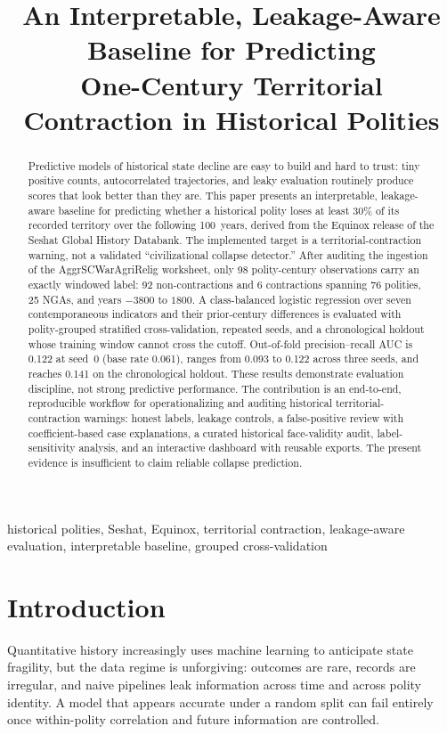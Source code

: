 \documentclass[conference]{IEEEtran}
\title{An Interpretable, Leakage-Aware Baseline for Predicting\\
One-Century Territorial Contraction in Historical Polities}
\author{
\IEEEauthorblockN{Shailesh Mishra (PES2UG24CS453), Shalik S (PES2UG24CS454),\\
Spoorthi A N (PES2UG24CS515), Aaron (PES2UG24CSXXX)}
\IEEEauthorblockA{Department of Computer Science and Engineering\\
PES University, Bengaluru, India}
}
\begin{document}
\maketitle

\begin{abstract}
Predictive models of historical state decline are easy to build and hard to
trust: tiny positive counts, autocorrelated trajectories, and leaky evaluation
routinely produce scores that look better than they are. This paper presents an
interpretable, leakage-aware baseline for predicting whether a historical
polity loses at least 30\% of its recorded territory over the following
100~years, derived from the Equinox release of the Seshat Global History
Databank. The implemented target is a territorial-contraction warning, not a
validated ``civilizational collapse detector.'' After auditing the ingestion of
the AggrSCWarAgriRelig worksheet, only 98 polity-century observations carry an
exactly windowed label: 92 non-contractions and 6 contractions spanning 76
polities, 25 NGAs, and years $-3800$ to $1800$. A class-balanced logistic
regression over seven contemporaneous indicators and their prior-century
differences is evaluated with polity-grouped stratified cross-validation,
repeated seeds, and a chronological holdout whose training window cannot cross
the cutoff. Out-of-fold precision--recall AUC is 0.122 at seed~0 (base rate
0.061), ranges from 0.093 to 0.122 across three seeds, and reaches 0.141 on the
chronological holdout. These results demonstrate evaluation discipline, not
strong predictive performance. The contribution is an end-to-end, reproducible
workflow for operationalizing and auditing historical territorial-contraction
warnings: honest labels, leakage controls, a false-positive review with
coefficient-based case explanations, a curated historical face-validity audit,
label-sensitivity analysis, and an interactive dashboard with reusable exports.
The present evidence is insufficient to claim reliable collapse prediction.
\end{abstract}

\begin{IEEEkeywords}
historical polities, Seshat, Equinox, territorial contraction, leakage-aware
evaluation, interpretable baseline, grouped cross-validation
\end{IEEEkeywords}

\section{Introduction}
Quantitative history increasingly uses machine learning to anticipate state
fragility, but the data regime is unforgiving: outcomes are rare, records are
irregular, and naive pipelines leak information across time and across polity
identity. A model that appears accurate under a random split can fail entirely
once within-polity correlation and future information are controlled.
\end{document}
